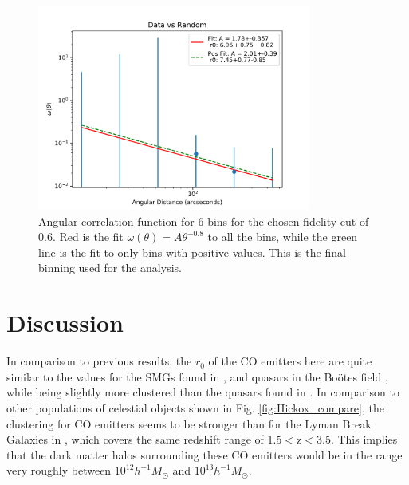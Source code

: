 \begin{figure}[!htbp]
\centering \includegraphics[width=90mm]{clustering_two/Data_vs_Random_20000_bin6_sn0_6_NFalse.png}
\caption{Angular correlation function for 6 bins for the chosen fidelity cut of 0.6. Red is the fit $\omega(\theta) = A\theta^{-0.8}$ to all the bins, while the green line is the fit to only bins with positive values. This is the final binning used for the analysis. }
\label{fig:Angular_binnings}
\end{figure}

\section{Discussion}

In comparison to previous results, the $r_0$ of the CO emitters here are quite similar to the values for the SMGs found in \cite{10.1111/j.1365-2966.2011.20303.x}, and quasars in the Bo\"otes field \cite{hickox2011clustering}, while being slightly more clustered than the quasars found in \cite{ross2009clustering}. In comparison to other populations of celestial objects shown in Fig. \ref{fig:Hickox_compare}, the clustering for CO emitters seems to be stronger than for the Lyman Break Galaxies in \cite{adelberger2005spatial}, which covers the same redshift range of 1.5$<$z$<$3.5. This implies that the dark matter halos surrounding these CO emitters would be in the range very roughly between $10^{12} h^{-1}M_{\odot}$ and $10^{13} h^{-1}M_{\odot}$.

